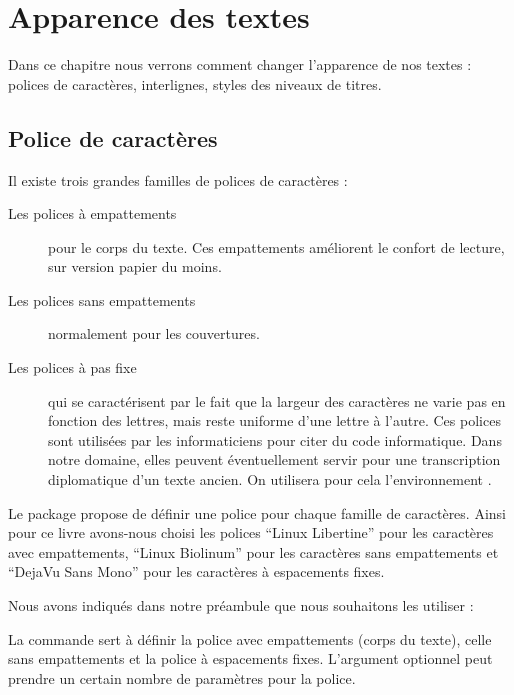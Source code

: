 \chapter{Apparence des textes}


\begin{intro}
Dans ce chapitre nous verrons comment changer l'apparence de nos textes : polices de caractères, interlignes, styles des niveaux de titres.  
\end{intro}

\section{Police de caractères}

Il existe trois grandes familles de polices de caractères : 
\begin{description}
\item[Les polices à empattements]pour le corps du texte. Ces empattements améliorent le confort de lecture, sur version papier du moins. 
\item[Les polices sans empattements]normalement pour les couvertures.
\item[Les polices à pas fixe]qui se caractérisent par le fait que la largeur des caractères ne varie pas en fonction des lettres, mais reste uniforme d'une lettre à l'autre. Ces polices sont utilisées par les informaticiens pour citer du code informatique. Dans notre domaine, elles peuvent éventuellement servir pour une transcription diplomatique d'un texte ancien. On utilisera pour cela  l'environnement .
\end{description}

Le package  propose de définir une police pour chaque famille de caractères. Ainsi pour ce livre avons-nous choisi les polices \enquote{Linux Libertine} pour les caractères avec empattements, \enquote{Linux Biolinum} pour les caractères sans empattements et \enquote{DejaVu  Sans Mono} pour les caractères à espacements fixes.

Nous avons indiqués dans notre préambule que nous souhaitons les utiliser :

\begin{latexcode}
\setmainfont[Mapping=tex-text]{Linux Libertine}
\setsansfont[Mapping=tex-text]{Linux Biolinum}
\setmonofont[Scale=0.75]{DejaVu  Sans Mono}
\end{latexcode}

La commande  sert à définir la police avec empattements (corps du texte),  celle sans empattements et  la police à espacements fixes. L'argument optionnel peut prendre un certain nombre de paramètres pour la police. 

